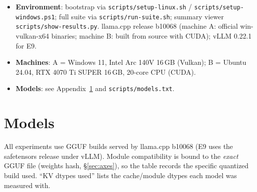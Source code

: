 \documentclass[11pt]{article}
\newcommand{\code}[1]{\texttt{#1}}
\begin{document}
\begin{itemize}
  \item \textbf{Environment}: bootstrap via \code{scripts/setup-linux.sh} / \code{scripts/setup-windows.ps1}; full suite via \code{scripts/run-suite.sh}; summary viewer \code{scripts/show-results.py}. llama.cpp release b10068 (machine A: official win-vulkan-x64 binaries; machine B: built from source with CUDA); vLLM 0.22.1 for E9.
  \item \textbf{Machines}: A = Windows 11, Intel Arc 140V 16\,GB (Vulkan); B = Ubuntu 24.04, RTX 4070 Ti SUPER 16\,GB, 20-core CPU (CUDA).
  \item \textbf{Models}: see Appendix~\ref{app:models} and \code{scripts/models.txt}.
\end{itemize}

\appendix

\section{Models}
\label{app:models}

All experiments use GGUF builds served by llama.cpp b10068 (E9 uses the safetensors release under vLLM). Module compatibility is bound to the \emph{exact} GGUF file (weights hash, \S\ref{sec:axes}), so the table records the specific quantized build used. ``KV dtypes used'' lists the cache/module dtypes each model was measured with.
\end{document}
